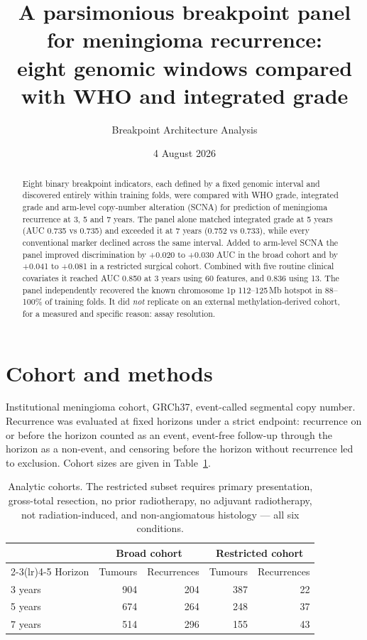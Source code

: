 \documentclass[11pt]{article}
\title{\vspace{-2em}A parsimonious breakpoint panel for meningioma recurrence:\\
\large eight genomic windows compared with WHO and integrated grade}
\author{Breakpoint Architecture Analysis}
\date{4 August 2026}
\begin{document}
\maketitle

\begin{abstract}
\noindent
Eight binary breakpoint indicators, each defined by a fixed genomic interval and
discovered entirely within training folds, were compared with WHO grade,
integrated grade and arm-level copy-number alteration (SCNA) for prediction of
meningioma recurrence at 3, 5 and 7 years. The panel alone matched integrated
grade at 5 years (AUC 0.735 vs 0.735) and exceeded it at 7 years
(0.752 vs 0.733), while every conventional marker declined across the same
interval. Added to arm-level SCNA the panel improved discrimination by
+0.020 to +0.030 AUC in the broad cohort and by +0.041 to +0.081 in a restricted
surgical cohort. Combined with five routine clinical covariates it reached
AUC 0.850 at 3 years using 60 features, and 0.836 using 13. The panel
independently recovered the known chromosome 1p 112--125\,Mb hotspot in
88--100\% of training folds. It did \emph{not} replicate on an external
methylation-derived cohort, for a measured and specific reason: assay
resolution.
\end{abstract}

\section{Cohort and methods}

Institutional meningioma cohort, GRCh37, event-called segmental copy number.
Recurrence was evaluated at fixed horizons under a strict endpoint: recurrence
on or before the horizon counted as an event, event-free follow-up through the
horizon as a non-event, and censoring before the horizon without recurrence led
to exclusion. Cohort sizes are given in Table~\ref{tab:cohort}.

\begin{table}[H]
\centering
\caption{Analytic cohorts. The restricted subset requires primary presentation,
gross-total resection, no prior radiotherapy, no adjuvant radiotherapy, not
radiation-induced, and non-angiomatous histology --- all six conditions.}
\label{tab:cohort}
\begin{tabular}{lrrrr}
\toprule
& \multicolumn{2}{c}{Broad cohort} & \multicolumn{2}{c}{Restricted cohort} \\
\cmidrule(lr){2-3}\cmidrule(lr){4-5}
Horizon & Tumours & Recurrences & Tumours & Recurrences \\
\midrule
3 years & 904 & 204 & 387 & 22 \\
5 years & 674 & 264 & 248 & 37 \\
7 years & 514 & 296 & 155 & 43 \\
\bottomrule
\end{tabular}
\end{table}
\end{document}
